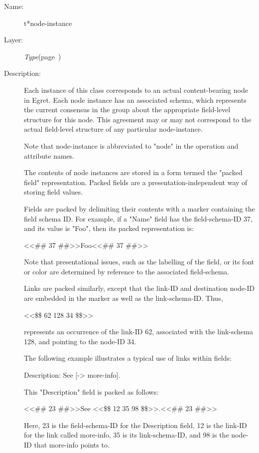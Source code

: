 \begin{description}
\item [Name:]  t*node-instance

\item [Layer:] {\sl Type}\hfill(page~\pageref{Type})

\item [Description:]

Each instance of this class corresponds to an actual
content-bearing node in Egret.  Each node instance has
an associated schema, which represents the current
consensus in the group about the appropriate field-level
structure for this node.  This agreement may or may not
correspond to the actual field-level structure of any
particular node-instance.

Note that node-instance is abbreviated to "node" in
the operation and attribute names. 

The contents of node instances are stored in a form
termed the "packed field" representation. Packed fields
are a presentation-independent way of storing field
values. 

Fields are packed by delimiting their contents with a
marker containing the field schema ID. For example, if a
"Name" field has the field-schema-ID 37, and its value
is "Foo", then its packed representation is:

<<\#\# 37 \#\#>>Foo<<\#\# 37 \#\#>>

Note that presentational issues, such as the labelling
of the field, or its font or color are determined by
reference to the associated field-schema.

Links are packed similarly, except that the link-ID
and destination node-ID are embedded in the marker as
well as the link-schema-ID. Thus,

<<\$\$ 62 128 34 \$\$>> 

represents an occurrence of the link-ID 62, associated
with the link-schema 128, and pointing to the node-ID
34.  

The following example illustrates a typical use of links
within fields:

Description: See [-> more-info]. 

This "Description" field is packed as follows:

<<\#\# 23 \#\#>>See <<\$\$ 12 35 98 \$\$>>.<<\#\# 23 \#\#>>

Here, 23 is the field-schema-ID for the Description
field, 12 is the link-ID for the link called more-info,
35 is its link-schema-ID, and 98 is the node-ID that
more-info points to.



\end{description}
